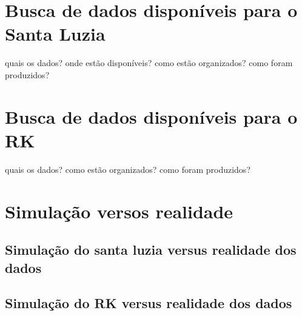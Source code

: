 \section{Busca de dados disponíveis para o Santa Luzia}

quais os dados? onde estão disponíveis? como estão organizados?
como foram produzidos?

\section{Busca de dados disponíveis para o RK}

quais os dados? como estão organizados? como foram produzidos?

\section{Simulação versos realidade}

\subsection{Simulação do santa luzia versus realidade dos dados}

\subsection{Simulação do RK versus realidade dos dados}

